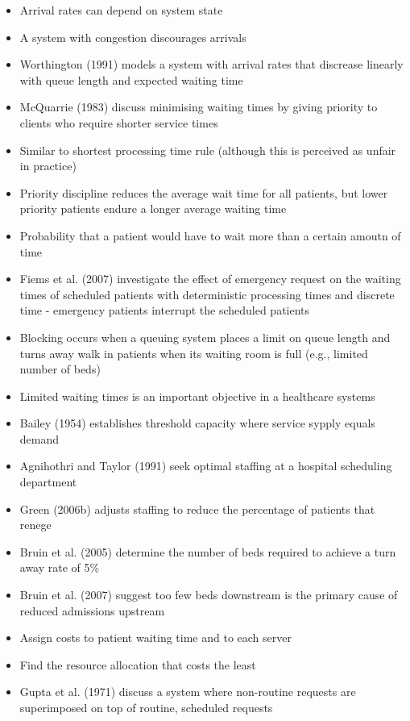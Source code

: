 \documentclass{article}
\begin{document}
\begin{itemize}
    \item Arrival rates can depend on system state
    \item A system with congestion discourages arrivals
    \item Worthington (1991) models a system with arrival rates that discrease linearly with queue length and expected waiting time
    \item McQuarrie (1983) discuss minimising waiting times by giving priority to clients who require shorter service times
    \item Similar to shortest processing time rule (although this is perceived as unfair in practice)
    \item Priority discipline reduces the average wait time for all patients, but lower priority patients endure a longer average waiting time
    \item Probability that a patient would have to wait more than a certain amoutn of time
    \item Fiems et al. (2007) investigate the effect of emergency request on the waiting times of scheduled patients with deterministic processing times and discrete time - emergency patients interrupt the scheduled patients
    \item Blocking occurs when a queuing system places a limit on queue length and turns away walk in patients when its waiting room is full (e.g., limited number of beds)
    \item Limited waiting times is an important objective in a healthcare systems
    \item Bailey (1954) establishes threshold capacity where service sypply equals demand
    \item Agnihothri and Taylor (1991) seek optimal staffing at a hospital scheduling department
    \item Green (2006b) adjusts staffing to reduce the percentage of patients that renege
    \item Bruin et al. (2005) determine the number of beds required to achieve a turn away rate of 5\%
    \item Bruin et al. (2007) suggest too few beds downstream is the primary cause of reduced admissions upstream
    \item Assign costs to patient waiting time and to each server
    \item Find the resource allocation that costs the least
    \item Gupta et al. (1971) discuss a system where non-routine requests are superimposed on top of routine, scheduled requests

\end{itemize}
\end{document}
